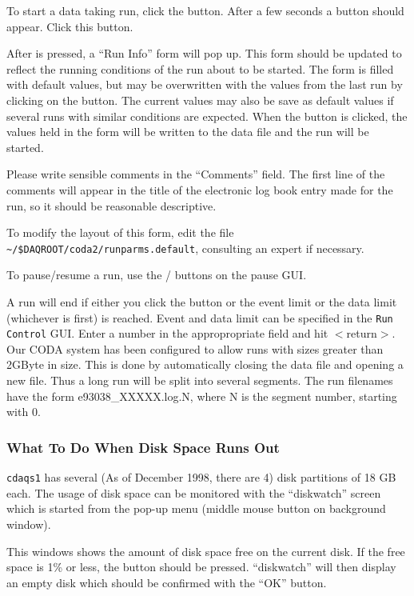 To start a data taking run, click the {\bf{}} button.  After a few
seconds a {\bf{}} button should appear.  Click this button.

After {\bf{}} is pressed, a ``Run Info'' form will
pop up.  This form should be updated to reflect the running conditions of
the run about to be started.  The form is filled with default values, but
may be overwritten with the values from the last run by clicking on the
{\bf{}} button.  The current values may also be save as default
values if several runs with similar conditions are expected.  When the
{\bf{}} button is clicked, the values held in the form will be written 
to the data file and the run will be started.

Please write sensible comments in the ``Comments'' field.  The first line of 
the
comments will appear in the title of the electronic log book entry made for the
run, so it should be reasonable descriptive.

To modify the layout of this form, edit the file
\verb|~/$DAQROOT/coda2/runparms.default|, consulting an expert if necessary.

To pause/resume a run, use the {\bf{}}/{\bf{}} buttons on
the pause GUI. 

A run will end if either you click the  button or the event
limit or the data limit (whichever is first) is reached. Event and
data limit can be specified in the \verb|Run Control| GUI. Enter a
number in the appropropriate field and hit $<$return$>$.  Our CODA
system has been configured to allow runs with sizes greater than
2GByte in size. This is done by automatically closing the data file
and opening a new file. Thus a long run will be split into several
segments. The run filenames have the form e93038\_XXXXX.log.N, where N
is the segment number, starting with 0.



\subsubsection{What To Do When Disk Space Runs Out}

\label{disk}
\verb|cdaqs1| has several (As of December 1998, there are 4)
disk partitions of 18 GB each.  The usage of
disk space can be monitored with the ``diskwatch'' screen which is started
from the pop-up menu (middle mouse button on background window).

This windows shows the amount of disk space free on the current disk.
If the free space is 1\% or less, the   button should be
pressed.  ``diskwatch'' will then display an empty disk which should be
confirmed with the ``OK'' button.

